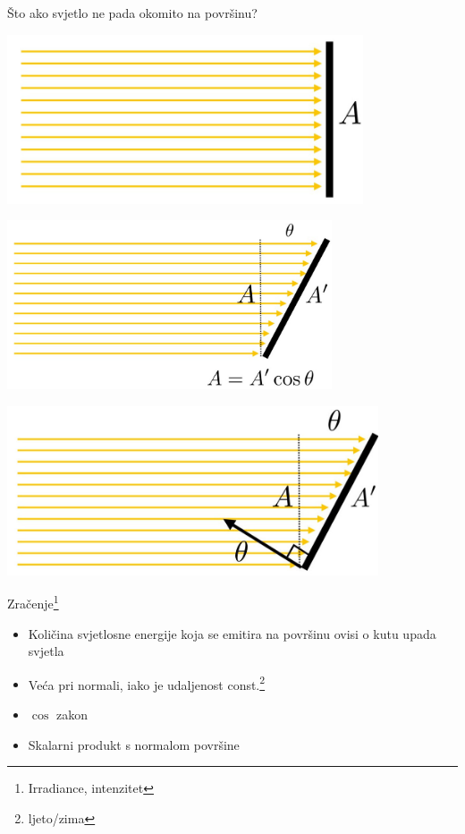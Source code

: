 \documentclass[9pt]{beamer}
\begin{document}
\begin{frame}{Što ako svjetlo ne pada okomito na površinu?}
	\only<1> {
		\begin{center}
			\includegraphics[height=5cm]{slike/slide_023_cropped.jpg}
	\end{center}}
	 {
		\begin{center}
			\includegraphics[height=5cm]{slike/slide_024_cropped.jpg}
	\end{center}}
	 {
		\begin{center}
			\includegraphics[height=5cm]{slike/slide_025_cropped.jpg}
	\end{center}}
\end{frame}
\begin{frame}{Zračenje\footnote[frame]{Irradiance, intenzitet}}
	\begin{itemize}
		\item Količina svjetlosne energije koja se emitira na površinu ovisi o kutu upada svjetla
		\item Veća pri normali, iako je udaljenost const.\footnote[frame]{ljeto/zima}
		\item $\cos$ zakon
		\item Skalarni produkt s normalom površine
	\end{itemize}
\end{frame}
\end{document}
